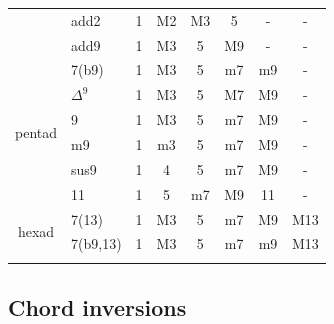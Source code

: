 \documentclass{article}
\begin{document}
\begin{table}[!h]
\begin{tabular}{clcccccc}
		                       & add2     & 1 & M2  & M3& 5   & -  & -\\
		                       & add9     & 1 & M3  & 5 & M9  & -  & -\\
		\hline
		\multirow{6}{*}{pentad}& 7(b9)      & 1 & M3  & 5 & m7  & m9  & -\\
	                           & $\Delta^9$ & 1 & M3  & 5 & M7  & M9  & -\\
		                       & 9          & 1 & M3  & 5 & m7  & M9  & -\\
		                       & m9         & 1 & m3  & 5 & m7  & M9  & -\\
		                       & sus9       & 1 & 4   & 5 & m7  & M9  & -\\
		                       & 11         & 1 & 5   & m7& M9  & 11  & -\\ %
		\hline
		\multirow{2}{*}{hexad} & 7(13)      & 1 & M3  & 5 & m7  & M9  & M13\\ %
		                       & 7(b9,13)   & 1 & M3  & 5 & m7  & m9  & M13\\
		\hline \vspace{-0.2cm}
	\end{tabular}
	\label{tab: }
\end{table}

\newpage
\subsection{Chord inversions}
\end{document}
